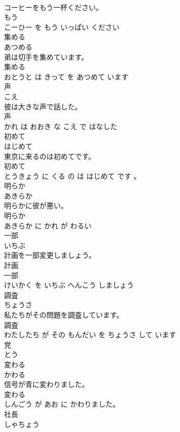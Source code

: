 \documentclass[8pt]{extreport}
\begin{document}
\begin{CJK}{UTF8}{min}
\\	コーヒーをもう一杯ください。	
\\	もう 
\\	こーひー を もう いっぱい ください			
\\	集める	
\\	あつめる			
\\	弟は切手を集めています。	
\\	集める 
\\	おとうと は きって を あつめて います			
\\	声	
\\	こえ			
\\	彼は大きな声で話した。	
\\	声 
\\	かれ は おおき な こえ で はなした			
\\	初めて	
\\	はじめて			
\\	東京に来るのは初めてです。	
\\	初めて 
\\	とうきょう に くる の は はじめて です 。			
\\	明らか	
\\	あきらか			
\\	明らかに彼が悪い。	
\\	明らか 
\\	あきらか に かれ が わるい			
\\	一部	
\\	いちぶ			
\\	計画を一部変更しましょう。	
\\	計画 
\\	一部 
\\	けいかく を いちぶ へんこう しましょう			
\\	調査	
\\	ちょうさ			
\\	私たちがその問題を調査しています。	
\\	調査 
\\	わたしたち が その もんだい を ちょうさ して います			
\\	党	
\\	とう			
\\	変わる	
\\	かわる			
\\	信号が青に変わりました。	
\\	変わる 
\\	しんごう が あお に かわりました。			
\\	社長	
\\	しゃちょう			

\end{CJK}
\end{document}
